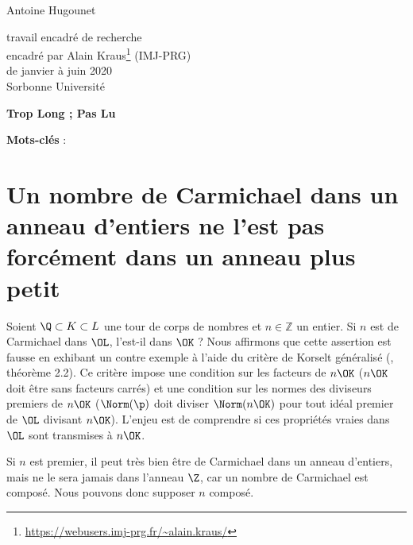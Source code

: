 \documentclass[a4paper, 12pt, oneside]{article}
\begin{document}
\begin{titlepage}
\begin{center}
	\large Antoine Hugounet \\

	\vspace{40px}
	\LARGE {}

	\vspace{40px}
	\large
	travail encadré de recherche \\
	encadré par Alain Kraus\footnote{\url{https://webusers.imj-prg.fr/~alain.kraus/}} (IMJ-PRG) \\
	de janvier à juin 2020 \\

	\vspace{20px}
	Sorbonne Université
\end{center}

\normalsize
\vspace{80px}
\begin{center} \textbf{Trop Long ; Pas Lu} \end{center}
\vspace{-1em}

\vfill
\begin{center}
	\normalsize \textbf{Mots-clés} : \textit{}
\end{center}
\end{titlepage}

\section{Un nombre de Carmichael dans un anneau d'entiers ne l'est pas forcément dans un anneau plus petit}

Soient $\Q \subset K \subset L$ une tour de corps de nombres et $n\in \mathbb{Z}$ un entier. Si $n$ est de Carmichael dans $\OL$, l'est-il dans $\OK$ ? Nous affirmons que cette assertion est fausse en exhibant un contre exemple à l'aide du critère de Korselt généralisé (\cite{article}, théorème 2.2). Ce critère impose une condition sur les facteurs de $n\OK$ ($n\OK$ doit être sans facteurs carrés) et une condition sur les normes des diviseurs premiers de $n\OK$ ($\Norm(\p)$ doit diviser $\Norm(n\OK)$ pour tout idéal premier de $\OL$ divisant $n\OK$). L'enjeu est de comprendre si ces propriétés vraies dans $\OL$ sont transmises à $n\OK$.

\begin{remarque}Si $n$ est premier, il peut très bien être de Carmichael dans un anneau d'entiers, mais ne le sera jamais dans l'anneau $\Z$, car un nombre de Carmichael est composé. Nous pouvons donc supposer $n$ composé. \end{remarque}
\end{document}
